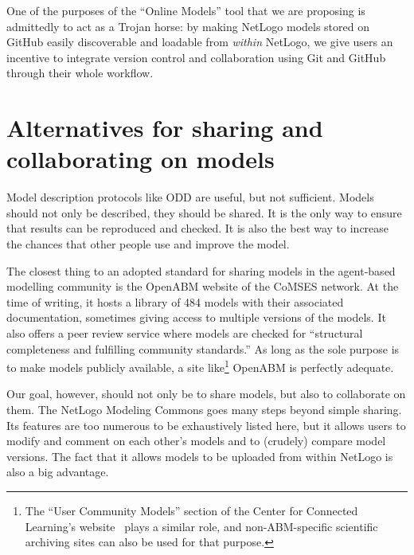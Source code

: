 \documentclass[runningheads]{llncs}
\begin{document}
One of the purposes of the ``Online Models'' tool that we are proposing is admittedly to act as a Trojan horse: by making NetLogo models stored on GitHub easily discoverable and loadable from \emph{within} NetLogo, we give users an incentive to integrate version control and collaboration using Git and GitHub through their whole workflow.

\section{Alternatives for sharing and collaborating on models}

Model description protocols like ODD \cite{grimm_standard_2006,grimm_odd_2010} are useful, but not sufficient. Models should not only be described, they should be shared. It is the only way to ensure that results can be reproduced and checked. It is also the best way to increase the chances that other people use and improve the model.

The closest thing to an adopted standard for sharing models in the agent-based modelling community is the OpenABM website of the CoMSES network\cite{noauthor_comses_nodate}. At the time of writing, it hosts a library of 484 models with their associated documentation, sometimes giving access to multiple versions of the models. It also offers a peer review service where models are checked for ``structural completeness and fulfilling community standards.'' As long as the sole purpose is to make models publicly available, a site like\footnote{The ``User Community Models'' section of the Center for Connected Learning's website \cite{noauthor_netlogo_nodate} plays a similar role, and non-ABM-specific scientific archiving sites\cite{noauthor_dataverse_nodate,noauthor_open_nodate,noauthor_zenodo_nodate} can also be used for that purpose.} OpenABM is perfectly adequate.

Our goal, however, should not only be to share models, but also to collaborate on them. The NetLogo Modeling Commons \cite{lerner_connected_2010,lerner_agent-based_2014} goes many steps beyond simple sharing. Its features are too numerous to be exhaustively listed here, but it allows users to modify and comment on each other's models and to (crudely) compare model versions. The fact that it allows models to be uploaded from within NetLogo is also a big advantage.
\end{document}
